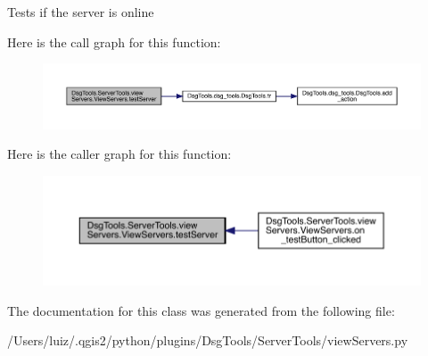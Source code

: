 \begin{DoxyVerb}Tests if the server is online
\end{DoxyVerb}
 Here is the call graph for this function\+:
\nopagebreak
\begin{figure}[H]
\begin{center}
\leavevmode
\includegraphics[width=350pt]{class_dsg_tools_1_1_server_tools_1_1view_servers_1_1_view_servers_a89e079ce02772a75b08d6ffb77e0b516_cgraph}
\end{center}
\end{figure}
Here is the caller graph for this function\+:
\nopagebreak
\begin{figure}[H]
\begin{center}
\leavevmode
\includegraphics[width=350pt]{class_dsg_tools_1_1_server_tools_1_1view_servers_1_1_view_servers_a89e079ce02772a75b08d6ffb77e0b516_icgraph}
\end{center}
\end{figure}


The documentation for this class was generated from the following file\+:\begin{DoxyCompactItemize}
\item 
/\+Users/luiz/.\+qgis2/python/plugins/\+Dsg\+Tools/\+Server\+Tools/view\+Servers.\+py\end{DoxyCompactItemize}
